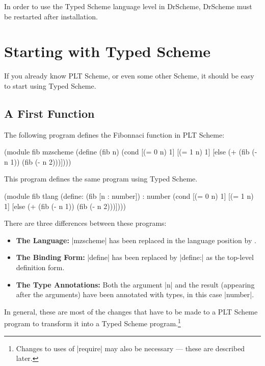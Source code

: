 \documentclass{book}
\begin{document}
\begin{schemeregion}
In order to use the Typed Scheme language level in DrScheme, DrScheme
must be restarted after installation.

\tableofcontents

\chapter{Starting with Typed Scheme}

If you already know PLT Scheme, or even some other Scheme, it should be
easy to start using Typed Scheme.

\section{A First Function}

The following program defines the Fibonnaci function in PLT Scheme:

\begin{schemedisplay}
(module fib mzscheme
  (define (fib n)
    (cond [(= 0 n) 1]
          [(= 1 n) 1]
          [else (+ (fib (- n 1)) (fib (- n 2)))])))
\end{schemedisplay} 

This program defines the same program using Typed Scheme.
 
\begin{schemedisplay}
(module fib tlang
  (define: (fib [n : number]) : number
    (cond [(= 0 n) 1]
          [(= 1 n) 1]
          [else (+ (fib (- n 1)) (fib (- n 2)))])))
\end{schemedisplay} 

There are three differences between these programs:

\begin{itemize}
  \item {\bf The Language:} \scheme|mzscheme| has been replaced in the
    language position by \tlang{}.

  \item {\bf The Binding Form:} \scheme|define| has been replaced by
    \scheme|define:| as the top-level definition form.

  \item {\bf The Type Annotations:} Both the argument \scheme|n| and
    the result (appearing after the arguments) have been annotated
    with types, in this case \scheme|number|.
\end{itemize}


In general, these are most of the changes that have to be made to a PLT Scheme
program to transform it into a Typed Scheme program.\footnote{Changes
  to uses of \scheme|require| may also be necessary --- these are
  described later.}





\end{schemeregion}
\end{document}
